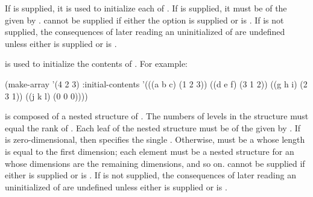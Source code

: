 If  is supplied, 
it is used to initialize each  of . 
If  is supplied,
it must be of the  given by .
 cannot be supplied if either the  option
is supplied or  is .
If  is not supplied,
the consequences of later reading an uninitialized  of 
are undefined
unless either  is supplied 
or  is .


 is used to initialize the contents of .
For example:

\code
 (make-array '(4 2 3) :initial-contents
             '(((a b c) (1 2 3))
              ((d e f) (3 1 2))
              ((g h i) (2 3 1))
              ((j k l) (0 0 0))))
\endcode


 is composed of a nested structure of . 
The numbers of levels in the structure must equal the rank of .
Each leaf of the nested structure must be of the  given by . 
If  is zero-dimensional, then  specifies the single
.  Otherwise,  must be a 
whose length is equal to the first dimension; each element must be a nested 
structure for an  whose dimensions are the remaining dimensions, 
and so on.
 cannot be supplied if either 
 is supplied
or  is .
If  is not supplied,
the consequences of later reading an uninitialized  of 
are undefined
unless either  is supplied
or  is .

